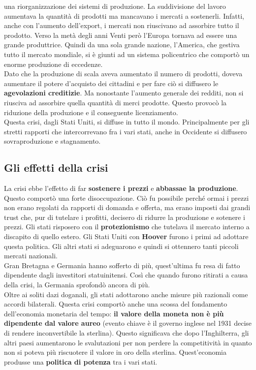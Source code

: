 una riorganizzazione dei sistemi di produzione. La suddivisione del lavoro aumentava la quantità
di prodotti ma mancavano i mercati a sostenerli. Infatti, anche con l'aumento dell'export, i mercati
non riuscivano ad assorbire tutto il prodotto. Verso la metà degli anni Venti però l'Europa tornava
ad essere una grande produttrice. Quindi da una sola grande nazione, l'America, che gestiva tutto
il mercato mondiale, si è giunti ad un sistema policentrico che comportò un enorme produzione di
eccedenze.\\
Dato che la produzione di scala aveva aumentato il numero di prodotti, doveva aumentare il potere
d'acquisto dei cittadini e per fare ciò si diffusero le \textbf{agevolazioni creditizie}. Ma 
nonostante l'aumento generale dei redditi, non si riusciva ad assorbire quella quantità di merci
prodotte. Questo provocò la riduzione della produzione e il conseguente licenziamento.\\
Questa crisi, dagli Stati Uniti, si diffuse in tutto il mondo. Principalmente per gli stretti
rapporti che intercorrevano fra i vari stati, anche in Occidente si diffusero sovraproduzione e
stagnamento.

\subsection{Gli effetti della crisi}
La crisi ebbe l'effetto di far \textbf{sostenere i prezzi} e \textbf{abbassae la produzione}.
Questo comportò una forte disoccupazione. Ciò fu possibile perché ormai i prezzi non erano regolati
da rapporti di domanda e offerta, ma erano imposti dai grandi trust che, pur di tutelare i profitti,
decisero di ridurre la produzione e sotenere i prezzi. Gli stati risposero con il 
\textbf{protezionismo} che tutelava il mercato interno a discapito di quello estero. Gli Stati Uniti
con \textbf{Hoover} furono i primi ad adottare questa politica. Gli altri stati si adeguarono e 
quindi si ottennero tanti piccoli mercati nazionali.\\
Gran Bretagna e Germania hanno sofferto di più, quest'ultima fu resa di fatto dipendente dagli 
investitori statuinitensi. Così che quando furono ritirati a causa della crisi, la Germania sprofondò
ancora di più.\\
Oltre ai soliti dazi doganali, gli stati adottarono anche misure più razionali come accordi 
bilaterali. Questa crisi comportò anche una scossa del fondamento dell'economia monetaria del tempo:
\textbf{il valore della moneta non è più dipendente dal valore aureo} (evento chiave è il governo 
inglese nel 1931 decise di rendere inconvertibile la sterlina). Questo significava che dopo 
l'Inghilterra, gli altri paesi aumentarono le svalutazioni per non perdere la competitività in quanto
non si poteva più riscuotere il valore in oro della sterlina. Quest'economia produsse una 
\textbf{politica di potenza} tra i vari stati.


